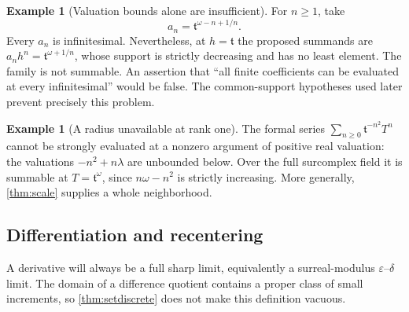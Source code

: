 \documentclass[11pt,a4paper]{article}
\numberwithin{equation}{section}
\theoremstyle{definition}
\newtheorem{example}[theorem]{Example}
\newcommand{\tmon}{\mathfrak t}
\begin{document}
\begin{example}[Valuation bounds alone are insufficient]\label{ex:badcoeff}
For $n\geq1$, take
\[
 a_n=\tmon^{\omega-n+1/n}.
\]
Every $a_n$ is infinitesimal. Nevertheless, at $h=\tmon$ the proposed summands
are $a_nh^n=\tmon^{\omega+1/n}$, whose support is strictly decreasing and
has no least element. The family is not summable. An assertion that
``all finite coefficients can be evaluated at every infinitesimal'' would be
false. The common-support hypotheses used later prevent precisely this problem.
\end{example}

\begin{example}[A radius unavailable at rank one]
The formal series $\sum_{n\geq0}\tmon^{-n^2}T^n$ cannot be strongly evaluated
at a nonzero argument of positive real valuation: the valuations
$-n^2+n\lambda$ are unbounded below. Over the full surcomplex field it is
summable at $T=\tmon^\omega$, since $n\omega-n^2$ is strictly increasing.
More generally, \cref{thm:scale} supplies a whole neighborhood.
\end{example}

\subsection{Differentiation and recentering}

A derivative will always be a full sharp limit, equivalently a
surreal-modulus $\varepsilon$--$\delta$ limit. The domain of a difference quotient
contains a proper class of small increments, so \cref{thm:setdiscrete} does not
make this definition vacuous.
\end{document}
